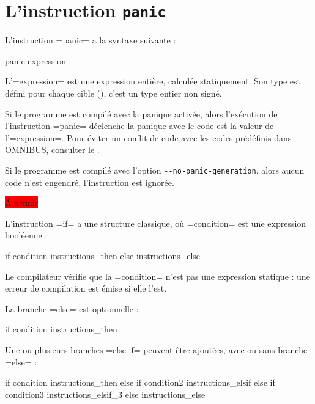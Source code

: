 \section{L'instruction \texttt{panic}}

L'instruction \omnibus=panic= a la syntaxe suivante :
\begin{OMNIBUS}
panic expression
\end{OMNIBUS}

L'\omnibus=expression= est une expression entière, calculée statiquement. Son type est défini pour chaque cible (), c'est un type entier non signé.

Si le programme est compilé avec la panique activée, alors l'exécution de l'instruction \omnibus=panic= déclenche la panique avec le code est la valeur de l'\omnibus=expression=. Pour éviter un conflit de code avec les codes prédéfinis dans OMNIBUS, consulter le .

Si le programme est compilé avec l'option \texttt{-{}-no-panic-generation}, alors aucun code n'est engendré, l'instruction est ignorée.





\colorbox{red}{À définir}



L'instruction \omnibus=if= a une structure classique, où \omnibus=condition= est une expression booléenne :
\begin{OMNIBUS}
if condition {
  instructions_then
}else{
  instructions_else
}
\end{OMNIBUS}

Le compilateur vérifie que la \omnibus=condition= n'est pas une expression statique : une erreur de compilation est émise si elle l'est.

La branche \omnibus=else= est optionnelle :
\begin{OMNIBUS}
if condition {
  instructions_then
}
\end{OMNIBUS}


Une ou plusieurs branches \omnibus=else if= peuvent être ajoutées, avec ou sans branche \omnibus=else= :
\begin{OMNIBUS}
if condition {
  instructions_then
}else if condition2 {
  instructions_elsif
}else if condition3 {
  instructions_elsif_3
}else{
  instructions_else
}
\end{OMNIBUS}


